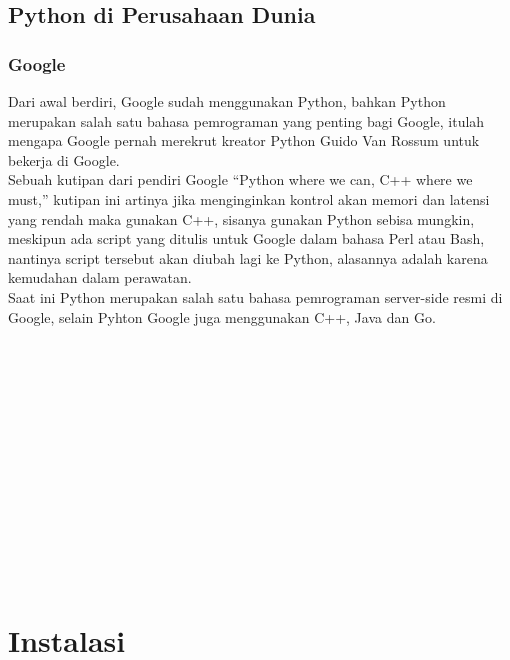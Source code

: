 \documentclass{article}
\begin{document}
\subsection{Python di Perusahaan Dunia}
\subsubsection{Google}
Dari awal berdiri, Google sudah menggunakan Python, bahkan Python merupakan salah satu bahasa pemrograman yang penting bagi Google, itulah mengapa Google pernah merekrut kreator Python Guido Van Rossum untuk bekerja di Google.\\

\noindent Sebuah kutipan dari pendiri Google “Python where we can, C++ where we must,” kutipan ini artinya jika menginginkan kontrol akan memori dan latensi yang rendah maka gunakan C++, sisanya gunakan Python sebisa mungkin, meskipun ada script yang ditulis untuk Google dalam bahasa Perl atau Bash, nantinya script tersebut akan diubah lagi ke Python, alasannya adalah karena kemudahan dalam perawatan.\\

\noindent Saat ini Python merupakan salah satu bahasa pemrograman server-side resmi di Google, selain Pyhton Google juga menggunakan C++, Java dan Go.
\\
\\
\\
\\
\\
\\
\\
\\
\\
\\
\\
\\
\\
\\

\section{Instalasi}
\end{document}

